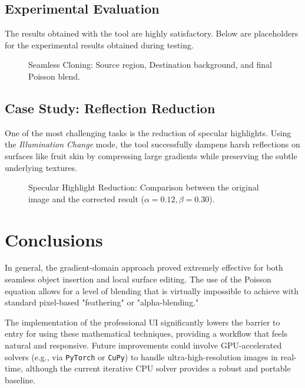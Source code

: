\documentclass[12pt,a4paper]{report}
\begin{document}
\section{Experimental Evaluation}
The results obtained with the tool are highly satisfactory. Below are placeholders for the experimental results obtained during testing.

\begin{figure}[H]
    \centering
    \vspace{4cm} %
    \caption{Seamless Cloning: Source region, Destination background, and final Poisson blend.}
\end{figure}

\section{Case Study: Reflection Reduction}
One of the most challenging tasks is the reduction of specular highlights. Using the \textit{Illumination Change} mode, the tool successfully dampens harsh reflections on surfaces like fruit skin by compressing large gradients while preserving the subtle underlying textures.

\begin{figure}[H]
    \centering
    \vspace{5cm} %
    \caption{Specular Highlight Reduction: Comparison between the original image and the corrected result ($\alpha=0.12, \beta=0.30$).}
\end{figure}

\chapter{Conclusions}
In general, the gradient-domain approach proved extremely effective for both seamless object insertion and local surface editing. The use of the Poisson equation allows for a level of blending that is virtually impossible to achieve with standard pixel-based "feathering" or "alpha-blending."

The implementation of the professional UI significantly lowers the barrier to entry for using these mathematical techniques, providing a workflow that feels natural and responsive. Future improvements could involve GPU-accelerated solvers (e.g., via \texttt{PyTorch} or \texttt{CuPy}) to handle ultra-high-resolution images in real-time, although the current iterative CPU solver provides a robust and portable baseline.
\end{document}
